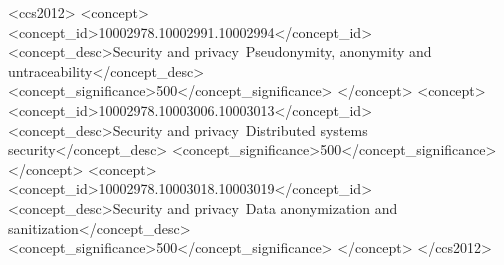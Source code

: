 \documentclass[sigconf]{acmart}
\begin{document}
\begin{sloppypar}



\begin{CCSXML}
<ccs2012>
<concept>
<concept_id>10002978.10002991.10002994</concept_id>
<concept_desc>Security and privacy~Pseudonymity, anonymity and untraceability</concept_desc>
<concept_significance>500</concept_significance>
</concept>
<concept>
<concept_id>10002978.10003006.10003013</concept_id>
<concept_desc>Security and privacy~Distributed systems security</concept_desc>
<concept_significance>500</concept_significance>
</concept>
<concept>
<concept_id>10002978.10003018.10003019</concept_id>
<concept_desc>Security and privacy~Data anonymization and sanitization</concept_desc>
<concept_significance>500</concept_significance>
</concept>
</ccs2012>
\end{CCSXML}


\maketitle




%







\label{lastpage}

\end{sloppypar}

\footnotesize


\end{document}
